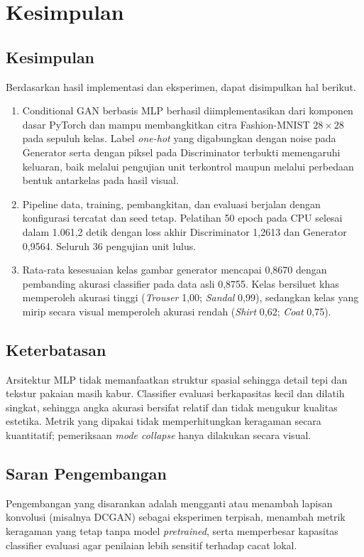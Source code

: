 \chapter{Kesimpulan}

\section{Kesimpulan}

Berdasarkan hasil implementasi dan eksperimen, dapat disimpulkan hal berikut.
\begin{enumerate}
    \item Conditional GAN berbasis MLP berhasil diimplementasikan dari komponen dasar PyTorch dan mampu membangkitkan citra Fashion-MNIST $28\times28$ pada sepuluh kelas. Label \textit{one-hot} yang digabungkan dengan noise pada Generator serta dengan piksel pada Discriminator terbukti memengaruhi keluaran, baik melalui pengujian unit terkontrol maupun melalui perbedaan bentuk antarkelas pada hasil visual.
    \item Pipeline data, training, pembangkitan, dan evaluasi berjalan dengan konfigurasi tercatat dan seed tetap. Pelatihan 50 epoch pada CPU selesai dalam 1.061,2 detik dengan loss akhir Discriminator 1,2613 dan Generator 0,9564. Seluruh 36 pengujian unit lulus.
    \item Rata-rata kesesuaian kelas gambar generator mencapai 0,8670 dengan pembanding akurasi classifier pada data asli 0,8755. Kelas bersiluet khas memperoleh akurasi tinggi (\textit{Trouser} 1,00; \textit{Sandal} 0,99), sedangkan kelas yang mirip secara visual memperoleh akurasi rendah (\textit{Shirt} 0,62; \textit{Coat} 0,75).
\end{enumerate}

\section{Keterbatasan}

Arsitektur MLP tidak memanfaatkan struktur spasial sehingga detail tepi dan tekstur pakaian masih kabur. Classifier evaluasi berkapasitas kecil dan dilatih singkat, sehingga angka akurasi bersifat relatif dan tidak mengukur kualitas estetika. Metrik yang dipakai tidak memperhitungkan keragaman secara kuantitatif; pemeriksaan \textit{mode collapse} hanya dilakukan secara visual.

\section{Saran Pengembangan}

Pengembangan yang disarankan adalah mengganti atau menambah lapisan konvolusi (misalnya DCGAN) sebagai eksperimen terpisah, menambah metrik keragaman yang tetap tanpa model \textit{pretrained}, serta memperbesar kapasitas classifier evaluasi agar penilaian lebih sensitif terhadap cacat lokal.
